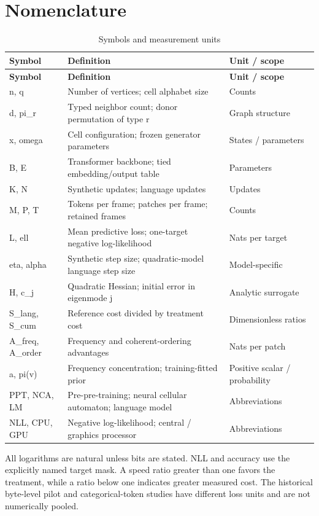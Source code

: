 \documentclass[11pt,a4paper]{article}
\begin{document}
\section*{Nomenclature}
{\small
\begin{longtable}{>{\raggedright\arraybackslash}p{}>{\raggedright\arraybackslash}p{}>{\raggedright\arraybackslash}p{}}
\caption{Symbols and measurement units}\\
\toprule
\textbf{Symbol} & \textbf{Definition} & \textbf{Unit /\allowbreak{} scope} \\
\midrule\endfirsthead
\toprule
\textbf{Symbol} & \textbf{Definition} & \textbf{Unit /\allowbreak{} scope} \\
\midrule\endhead
\bottomrule\endlastfoot
n, q & Number of vertices; cell alphabet size & Counts \\
d, pi\_\allowbreak{}r & Typed neighbor count; donor permutation of type r & Graph structure \\
x, omega & Cell configuration; frozen generator parameters & States /\allowbreak{} parameters \\
B, E & Transformer backbone; tied embedding/\allowbreak{}output table & Parameters \\
K, N & Synthetic updates; language updates & Updates \\
M, P, T & Tokens per frame; patches per frame; retained frames & Counts \\
L, ell & Mean predictive loss; one-target negative log-likelihood & Nats per target \\
eta, alpha & Synthetic step size; quadratic-model language step size & Model-specific \\
H, c\_\allowbreak{}j & Quadratic Hessian; initial error in eigenmode j & Analytic surrogate \\
S\_\allowbreak{}lang, S\_\allowbreak{}cum & Reference cost divided by treatment cost & Dimensionless ratios \\
A\_\allowbreak{}freq, A\_\allowbreak{}order & Frequency and coherent-ordering advantages & Nats per patch \\
a, pi(v) & Frequency concentration; training-fitted prior & Positive scalar /\allowbreak{} probability \\
PPT, NCA, LM & Pre-pre-training; neural cellular automaton; language model & Abbreviations \\
NLL, CPU, GPU & Negative log-likelihood; central /\allowbreak{} graphics processor & Abbreviations \\
\end{longtable}
}
All logarithms are natural unless bits are stated. NLL and accuracy use the explicitly named target mask. A speed ratio greater than one favors the treatment, while a ratio below one indicates greater measured cost. The historical byte-level pilot and categorical-token studies have different loss units and are not numerically pooled.
\end{document}
